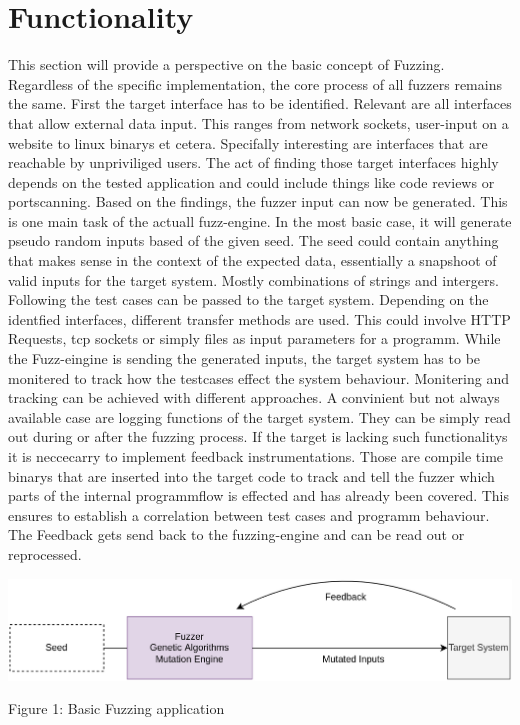 \documentclass[journal=tosc,final]{iacrtrans}
\begin{document}
\section{Functionality}
This section will provide a perspective on the basic concept of Fuzzing. Regardless of the specific implementation, the core process of all fuzzers remains the same. First the target interface has to be identified. Relevant are all interfaces that allow external data input. This ranges from network sockets, user-input on a website to linux binarys et cetera. Specifally interesting are interfaces that are reachable by unpriviliged users. The act of finding those target interfaces highly depends on the tested application and could include things like code reviews or portscanning. Based on the findings, the fuzzer input can now be generated. This is one main task of the actuall fuzz-engine. In the most basic case, it will generate pseudo random inputs based of the given seed. The seed could contain anything that makes sense in the context of the expected data, essentially a snapshoot of valid inputs for the target system. Mostly combinations of strings and intergers. Following the test cases can be passed to the  target system. Depending on the identfied interfaces, different transfer methods are used. This could involve HTTP Requests, tcp sockets or simply files as input parameters for a programm. While the Fuzz-eingine is sending the generated inputs, the target system has to be monitered to track how the testcases effect the system behaviour. Monitering and tracking can be achieved with different approaches. A convinient but not always available case are logging functions of the target system. They can be simply read out during or after the fuzzing process. If the target is lacking such functionalitys it is neccecarry to implement feedback instrumentations. Those are compile time binarys that are inserted into the target code to track and tell the fuzzer which parts of the internal programmflow is effected and has already been covered. This ensures to establish a correlation between test cases and programm behaviour. The Feedback gets send back to the fuzzing-engine and can be read out or reprocessed.
\newpage
\begin{shaded}

\begin{center}
 \includegraphics[scale=0.2]{../final2.png}

\vspace{2mm} Figure 1: Basic Fuzzing application
 \end{center}
\end{shaded}
\end{document}
